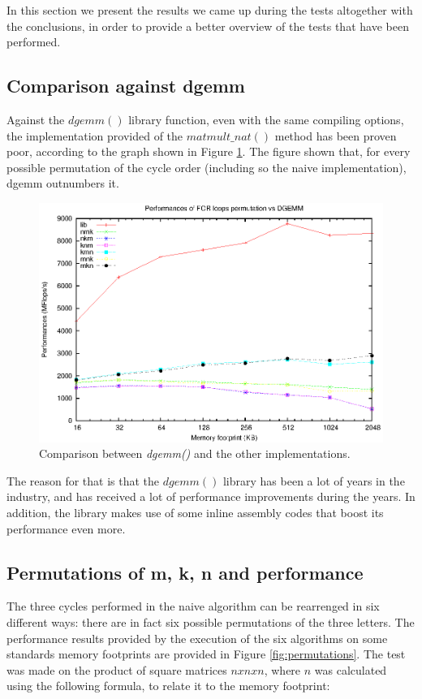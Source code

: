 In this section we present the results we came up during the tests altogether with the conclusions, in order to provide a better overview of the tests that have been performed. 

\subsection{Comparison against dgemm}

Against the $dgemm()$ library function, even with the same compiling options, the implementation provided of the $matmult\_nat()$ method has been proven poor, according to the graph shown in Figure \ref{fig:natdgemmcomp}. The figure shown that, for every possible permutation of the cycle order (including so the naive implementation), dgemm outnumbers it.

\begin{figure}[here]
\centering
\includegraphics[width=\textwidth]{results/dgemm.eps}
\caption{Comparison between \emph{dgemm()} and the other implementations.}
\label{fig:natdgemmcomp}
\end{figure}

The reason for that is that the $dgemm()$ library has been a lot of years in the industry, and has received a lot of performance improvements during the years. In addition, the library makes use of some inline assembly codes that boost its performance even more.

\subsection{Permutations of m, k, n and performance}
The three cycles performed in the naive algorithm can be rearrenged in six different ways: there are in fact six possible permutations of the three letters. The performance results provided by the execution of the six algorithms on some standards memory footprints are provided in Figure \ref{fig:permutations}. The test was made on the product of square matrices $nxnxn$, where $n$ was calculated using the following formula, to relate it to the memory footprint:

